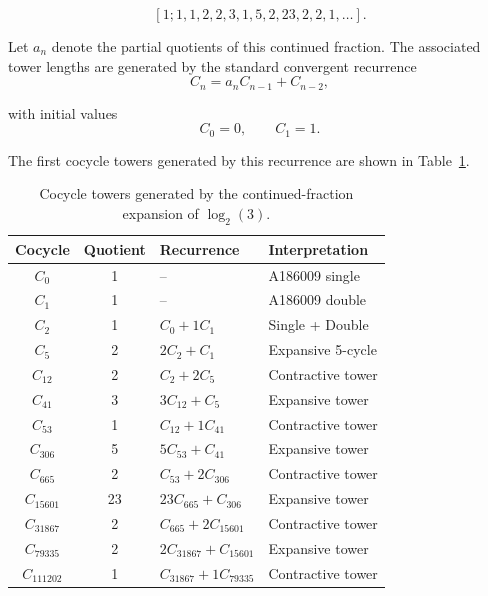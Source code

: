 \documentclass[12pt, oneside]{article}
\numberwithin{equation}{section}
\theoremstyle{definition}
\theoremstyle{plain}
\theoremstyle{remark}
\begin{document}
\[
[1;1,1,2,2,3,1,5,2,23,2,2,1,\ldots].
\]

Let $a_n$ denote the partial quotients of this continued fraction.
The associated tower lengths are generated by the standard convergent
recurrence
\[
C_n = a_n C_{n-1} + C_{n-2},
\]

with initial values
\[
C_0 = 0,
\qquad
C_1 = 1.
\]

The first cocycle towers generated by this recurrence are shown in
Table~\ref{tab:cocycle-towers}.
\begin{table}[h]
\centering
\caption{Cocycle towers generated by the continued-fraction expansion of $\log_2(3)$.}
\label{tab:cocycle-towers}
\begin{tabular}{c c l l}
\hline
Cocycle & Quotient & Recurrence & Interpretation \\
\hline

$C_0$       & 1  & -- & A186009 single \\

$C_1$       & 1  & -- & A186009 double \\

$C_2$       & 1  & $C_0 + 1 C_1$ & Single + Double \\

$C_5$       & 2  & $2 C_2 + C_1$ & Expansive 5-cycle \\

$C_{12}$    & 2  & $C_2 + 2 C_5$ & Contractive tower \\

$C_{41}$    & 3  & $3 C_{12} + C_5$ & Expansive tower \\

$C_{53}$    & 1  & $C_{12} + 1 C_{41}$ & Contractive tower \\

$C_{306}$   & 5  & $5C_{53} + C_{41}$ & Expansive tower \\

$C_{665}$   & 2  & $C_{53} + 2 C_{306}$ & Contractive tower \\

$C_{15601}$ & 23 & $23 C_{665} + C_{306}$ & Expansive tower \\

$C_{31867}$ & 2  & $C_{665} + 2 C_{15601}$ & Contractive tower \\

$C_{79335}$ & 2  & $2 C_{31867} + C_{15601}$ & Expansive tower \\

$C_{111202}$ & 1 & $C_{31867} + 1 C_{79335}$ & Contractive tower \\

\hline
\end{tabular}
\end{table}
\end{document}
